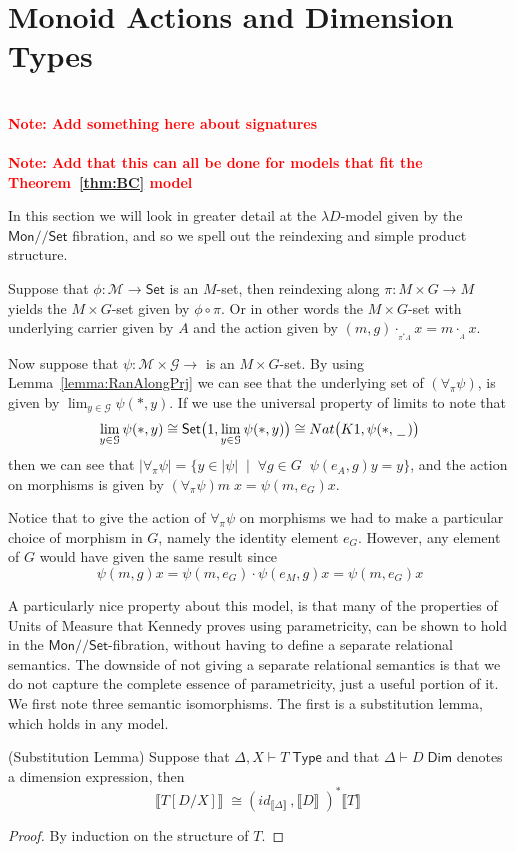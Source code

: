 \documentclass[a4paper,UKenglish]{lipics}
\newcommand\note[1]{{ \bf \textcolor{red} {\vspace{2mm}\; \\ Note: #1\\}}}
\newcommand{\UoM}{Units of Measure\xspace}
\newcommand{\msf}[1]{\mathsf{#1}} %
\newcommand{\Mon}{\msf{Mon}}
\newcommand{\Set}{\msf{Set}}
\newcommand{\blank}{\, \underline{\hspace{2mm}} \,}
\newcommand{\act}[1]{\cdot_{_{#1}}}
\newcommand{\GroupSet}[1]{#1/\!/\Set}
\newcommand{\MonSet}{\GroupSet{\Mon}}
\newcommand{\bbracket}[1]{\bigl( #1 \bigr)}
\newcommand{\sem}[1]{\ensuremath{\llbracket #1 \rrbracket} \;}
\newcommand{\Dj}[2]{#1 \vdash #2 \; \msf{ Dim}}
\newcommand{\Dim}{D}
\begin{document}
\section{Monoid Actions and Dimension Types}\label{sec:MonSet}
\note{Add something here about signatures}
\note{Add that this can all be done for models that fit the Theorem~\ref{thm:BC} model}

In this section we will look in greater detail at the $\lambda D$-model given by the $\MonSet$ fibration, and so we spell out the reindexing and simple product structure.

Suppose that $\phi: \mathcal{M}\rightarrow \Set$ is an $M$-set, then reindexing along $\pi : M \times G \rightarrow M$ yields the $M \times G$-set given by $\phi \circ \pi$. Or in other words the $M \times G$-set with underlying carrier given by $A$ and the action given by $(m,g) \act{\pi^{\ast}A} x = m \act{A} x$.

Now suppose that $\psi : \mathcal{M} \times \mathcal{G} \rightarrow$ is an $M \times G$-set. By using Lemma~\ref{lemma:RanAlongPrj} we can see that the underlying set of $ (\forall _\pi \psi)$, is given by $\lim_{y\in \mathcal{G}} \psi (\ast, y)$. If we use the universal property of limits to note that
\[
 \lim_{y\in \mathcal{G}} \psi (\ast, y) \cong \Set \bbracket{1, \lim_{y\in \mathcal{G}} \psi (\ast, y)} \cong Nat \bbracket{K1, \psi (\ast, \blank)}
\]
then we can see that $|\forall_\pi \psi | = \{y \in |\psi| \; \; | \; \; \forall g\in G \; \; \psi(e_A, g) y = y \}$, and the action on morphisms is given by $(\forall_\pi \psi) m \; x = \psi (m, e_G) x$.

Notice that to give the action of $\forall_\pi \psi$ on morphisms we had to make a particular choice of morphism in $G$, namely the identity element $e_G$. However, any element of $G$ would have given the same result since
\[
  \psi (m, g) x = \psi (m, e_G) \cdot \psi (e_M, g) x = \psi (m, e_G) x
\]

A particularly nice property about this model, is that many of the properties of \UoM that Kennedy proves using parametricity, can be shown to hold in the $\MonSet$-fibration, without having to define a separate relational semantics. The downside of not giving a separate relational semantics is that we do not capture the complete essence of parametricity, just a useful portion of it. We first note three semantic isomorphisms. The first is a substitution lemma, which holds in any model.

\begin{lemma}(Substitution Lemma)
\label{lem:subst}
Suppose that $\Delta, X \vdash T \; \msf{ Type}$ and that $\Dj\Delta \Dim$ denotes a dimension expression, then
\[
 \sem{T[D/X]} \cong (id_{\sem{\Delta}} , \sem{D})^\ast \sem{T}
\]
\end{lemma}
\begin{proof}
 By induction on the structure of $T$.
\end{proof}
\end{document}
